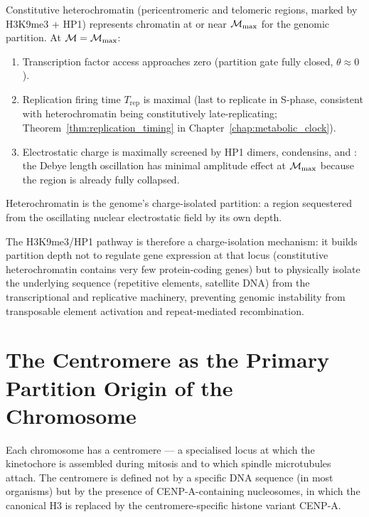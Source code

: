 \begin{proposition}
\label{prop:heterochromatin_max_depth}
Constitutive heterochromatin (pericentromeric and telomeric regions, marked
by H3K9me3 + HP1) represents chromatin at or near $\mathcal{M}_{\mathrm{max}}$
for the genomic partition. At $\mathcal{M} = \mathcal{M}_{\mathrm{max}}$:
\begin{enumerate}[label=(\roman*)]
  \item Transcription factor access approaches zero (partition gate fully
        closed, $\theta \approx 0$).
  \item Replication firing time $T_{\mathrm{rep}}$ is maximal (last to
        replicate in S-phase, consistent with heterochromatin being
        constitutively late-replicating; Theorem~\ref{thm:replication_timing}
        in Chapter~\ref{chap:metabolic_clock}).
  \item Electrostatic charge is maximally screened by HP1 dimers, condensins,
        and : the Debye length oscillation has minimal amplitude
        effect at $\mathcal{M}_{\mathrm{max}}$ because the region is already fully
        collapsed.
\end{enumerate}
Heterochromatin is the genome's charge-isolated partition: a region sequestered
from the oscillating nuclear electrostatic field by its own depth.
\end{proposition}

The H3K9me3/HP1 pathway is therefore a charge-isolation mechanism: it builds
partition depth not to regulate gene expression at that locus (constitutive
heterochromatin contains very few protein-coding genes) but to physically
isolate the underlying sequence (repetitive elements, satellite DNA) from the
transcriptional and replicative machinery, preventing genomic instability
from transposable element activation and repeat-mediated recombination.

\section{The Centromere as the Primary Partition Origin of the Chromosome}
\label{sec:centromere_partition}

Each chromosome has a centromere --- a specialised locus at which the
kinetochore is assembled during mitosis and to which spindle microtubules
attach. The centromere is defined not by a specific DNA sequence (in most
organisms) but by the presence of CENP-A-containing nucleosomes, in which
the canonical H3 is replaced by the centromere-specific histone variant CENP-A.

